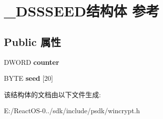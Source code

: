 \hypertarget{struct___d_s_s_s_e_e_d}{}\section{\+\_\+\+D\+S\+S\+S\+E\+E\+D结构体 参考}
\label{struct___d_s_s_s_e_e_d}
\subsection*{Public 属性}
\begin{DoxyCompactItemize}
\item 
\mbox{\label{struct___d_s_s_s_e_e_d_a1fe450d736d3668be346568ce74c2aec}} 
D\+W\+O\+RD {\bfseries counter}
\item 
\mbox{\label{struct___d_s_s_s_e_e_d_a2b1aaa1419289d442c4651e4fe4b10fe}} 
B\+Y\+TE {\bfseries seed} \mbox{[}20\mbox{]}
\end{DoxyCompactItemize}


该结构体的文档由以下文件生成\+:\begin{DoxyCompactItemize}
\item 
E\+:/\+React\+O\+S-\/0../sdk/include/psdk/wincrypt.\+h\end{DoxyCompactItemize}
